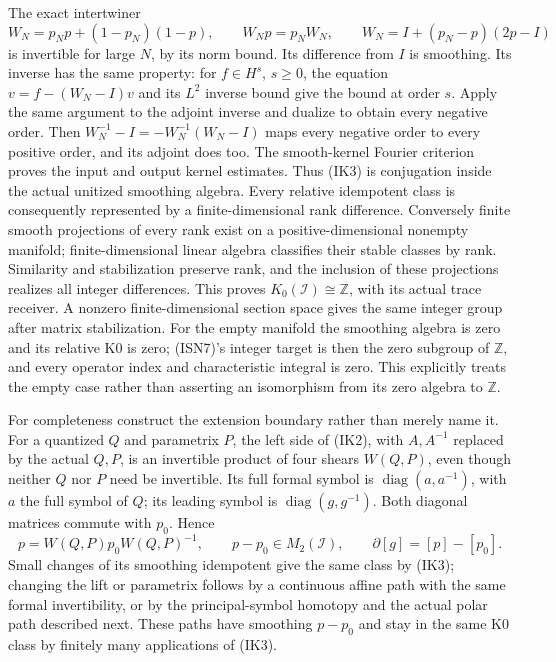 \documentclass[
  11pt,
]{article}
\newcounter{none} %
\begin{document}
The exact intertwiner \[
 W_N=p_Np+(1-p_N)(1-p),\qquad W_Np=p_NW_N,
 \qquad W_N=I+(p_N-p)(2p-I)
\tag{IK3}
\] is invertible for large \(N\), by its norm bound. Its difference from
\(I\) is smoothing. Its inverse has the same property: for \(f\in H^s\),
\(s\geq0\), the equation \(v=f-(W_N-I)v\) and its \(L^2\) inverse bound
give the bound at order \(s\). Apply the same argument to the adjoint
inverse and dualize to obtain every negative order. Then
\(W_N^{-1}-I=-W_N^{-1}(W_N-I)\) maps every negative order to every
positive order, and its adjoint does too. The smooth-kernel Fourier
criterion proves the input and output kernel estimates. Thus (IK3) is
conjugation inside the actual unitized smoothing algebra. Every relative
idempotent class is consequently represented by a finite-dimensional
rank difference. Conversely finite smooth projections of every rank
exist on a positive-dimensional nonempty manifold; finite-dimensional
linear algebra classifies their stable classes by rank. Similarity and
stabilization preserve rank, and the inclusion of these projections
realizes all integer differences. This proves
\(K_0(\mathcal I)\cong\mathbb Z\), with its actual trace receiver. A
nonzero finite-dimensional section space gives the same integer group
after matrix stabilization. For the empty manifold the smoothing algebra
is zero and its relative K0 is zero; (ISN7)'s integer target is then the
zero subgroup of \(\mathbb Z\), and every operator index and
characteristic integral is zero. This explicitly treats the empty case
rather than asserting an isomorphism from its zero algebra to
\(\mathbb Z\).

For completeness construct the extension boundary rather than merely
name it. For a quantized \(Q\) and parametrix \(P\), the left side of
(IK2), with \(A,A^{-1}\) replaced by the actual \(Q,P\), is an
invertible product of four shears \(W(Q,P)\), even though neither \(Q\)
nor \(P\) need be invertible. Its full formal symbol is
\(\operatorname{diag}(a,a^{-1})\), with \(a\) the full symbol of \(Q\);
its leading symbol is \(\operatorname{diag}(g,g^{-1})\). Both diagonal
matrices commute with \(p_0\). Hence \[
 p=W(Q,P)p_0W(Q,P)^{-1},\qquad p-p_0\in M_2(\mathcal I),
 \qquad \partial[g]=[p]-[p_0].
\tag{IK4}
\] Small changes of its smoothing idempotent give the same class by
(IK3); changing the lift or parametrix follows by a continuous affine
path with the same formal invertibility, or by the principal-symbol
homotopy and the actual polar path described next. These paths have
smoothing \(p-p_0\) and stay in the same K0 class by finitely many
applications of (IK3).
\end{document}
